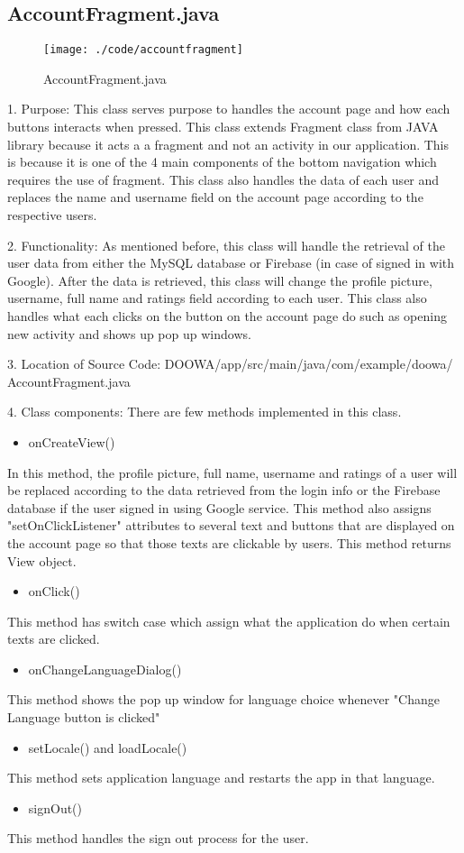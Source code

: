 \documentclass[conference]{IEEEtran}
\begin{document}
\subsection{AccountFragment.java}

\begin{figure}[h!]
\texttt{[image: ./code/accountfragment]}
\centering
\caption{AccountFragment.java}
\end{figure}

1. Purpose: This class serves purpose to handles the account page and how each buttons interacts when pressed. This class extends Fragment class from JAVA library because it acts a a fragment and not an activity in our application. This is because it is one of the 4 main components of the bottom navigation which requires the use of fragment. This class also handles the data of each user and replaces the name and username field on the account page according to the respective users.\break
\par 2. Functionality: As mentioned before, this class will handle the retrieval of the user data from either the MySQL database or Firebase (in case of signed in with Google). After the data is retrieved, this class will change the profile picture, username, full name and ratings field according to each user. This class also handles what each clicks on the button on the account page do such as opening new activity and shows up pop up windows.\break

3. Location of Source Code: DOOWA/app/src/main/java/com/example/doowa/ AccountFragment.java\break

4. Class components: There are few methods implemented in this class.
\begin{itemize}
\item onCreateView()
\end{itemize}
In this method, the profile picture, full name, username and ratings of a user will be replaced according to the data retrieved from the login info or the Firebase database if the user signed in using Google service. This method also assigns "setOnClickListener" attributes to several text and buttons that are displayed on the account page so that those texts are clickable by users. This method returns View object.
\begin{itemize}
\item onClick()
\end{itemize}
This method has switch case which assign what the application do when certain texts are clicked.
\begin{itemize}
\item onChangeLanguageDialog()
\end{itemize}
This method shows the pop up window for language choice whenever "Change Language button is clicked"
\begin{itemize}
\item setLocale() and loadLocale()
\end{itemize}
This method sets application language and restarts the app in that language.
\begin{itemize}
\item signOut()
\end{itemize}
This method handles the sign out process for the user.
\break
\end{document}
